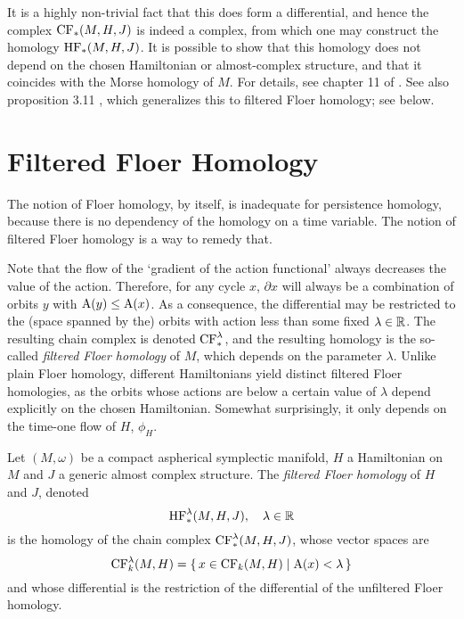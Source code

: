 It is a highly non-trivial fact that this does form a differential, and hence the complex $\CF_*(M,H,J)$ is indeed a complex, from which one may construct the homology $\HF_*(M,H,J)$. It is possible to show that this homology does not depend on the chosen Hamiltonian or almost-complex structure, and that it coincides with the Morse homology of $M$. For details, see chapter 11 of \cite{audin}. See also proposition 3.11 \cite{schwarz}, which generalizes this to filtered Floer homology; see below.

\section{Filtered Floer Homology}

The notion of Floer homology, by itself, is inadequate for persistence homology, because there is no dependency of the homology on a time variable. The notion of filtered Floer homology is a way to remedy that.

Note that the flow of the `gradient of the action functional' always decreases the value of the action. Therefore, for any cycle $x$, $\partial x$ will always be a combination of orbits $y$ with $\AA(y) \leq \AA(x)$. As a consequence, the differential may be restricted to the (space spanned by the) orbits with action less than some fixed $\lambda \in \R$. The resulting chain complex is denoted $\CF_*^\lambda$, and the resulting homology is the so-called \emph{filtered Floer homology} of $M$, which depends on the parameter $\lambda$. Unlike plain Floer homology, different Hamiltonians yield distinct filtered Floer homologies, as the orbits whose actions are below a certain value of $\lambda$ depend explicitly on the chosen Hamiltonian. Somewhat surprisingly, it only depends on the time-one flow of $H$, $\phi_H$.

\begin{definition}
Let $(M,\omega)$ be a compact aspherical symplectic manifold, $H$ a Hamiltonian on $M$ and $J$ a generic almost complex structure. The \emph{filtered Floer homology} of $H$ and $J$, denoted
\begin{equation}
\HF^\lambda_*(M,H,J), \quad \lambda \in \R
\end{equation}
is the homology of the chain complex $\CF^\lambda_*(M,H,J)$, whose vector spaces are
\begin{equation}
\CF^\lambda_k(M,H) = \{\, x \in \CF_k(M,H) \mid \AA(x) < \lambda\,\}
\end{equation}
and whose differential is the restriction of the differential of the unfiltered Floer homology.
\end{definition}

